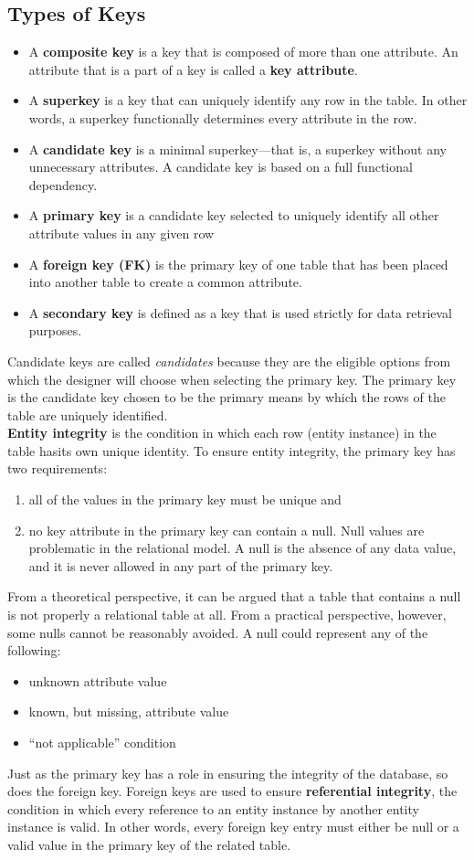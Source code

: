 \documentclass[a4paper, 12pt, titlepage]{report}
\begin{document}
\subsection{Types of Keys}
\begin{itemize}
\item A \textbf{composite key} is a key that is composed of more than one attribute. An attribute that is a part of a key is called a \textbf{key attribute}.
\item A \textbf{superkey} is a key that can uniquely identify any row in the table. In other words, a superkey functionally determines every attribute in the row.
\item A \textbf{candidate key} is a minimal superkey—that is, a superkey without any unnecessary attributes. A candidate key is based on a full functional dependency.
\item A \textbf{primary key} is a candidate key selected to uniquely identify all other attribute values in any given row
\item A \textbf{foreign key (FK)} is the primary key of one table that has been placed into another table to create a common attribute.
\item A \textbf{secondary key} is defined as a key that is used strictly for data retrieval purposes.
\end{itemize}
Candidate keys are called \emph{candidates} because they are the eligible options from which the designer will choose when selecting the primary key. The primary key is the candidate key chosen to be the primary means by which the rows of the table are uniquely identified.\\
\textbf{Entity integrity} is the condition in which each row (entity instance) in the table hasits own unique identity. To ensure entity integrity, the primary key has two requirements:
\begin{enumerate}
\item all of the values in the primary key must be unique and 
\item no key attribute in the primary key can contain a null. Null values are problematic in the relational model. A null is the absence of any data value, and it is never allowed in any part of the primary key.
\end{enumerate}
From a theoretical perspective, it can be argued that a table that contains a null is not properly a relational table at all. From a practical perspective, however, some nulls cannot be reasonably avoided. A null could represent any of the following:
\begin{itemize}
\item unknown attribute value
\item known, but missing, attribute value
\item “not applicable” condition
\end{itemize}
Just as the primary key has a role in ensuring the integrity of the database, so does the foreign key. Foreign keys are used to ensure \textbf{referential integrity}, the condition in which every reference to an entity instance by another entity instance is valid. In other words, every foreign key entry must either be null or a valid value in the primary key of the related table.
\end{document}
